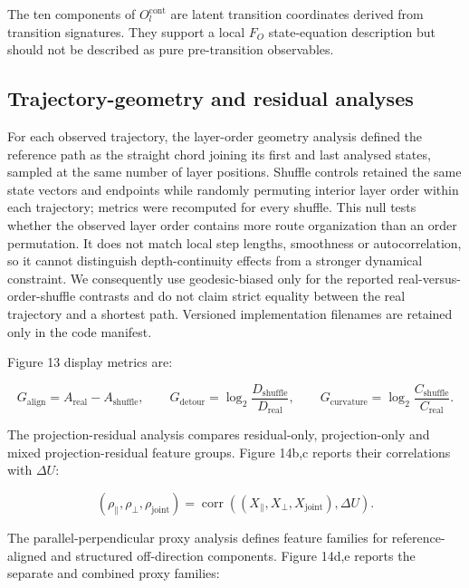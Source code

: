 \documentclass[11pt]{article}
\begin{document}
The ten components of \(O_l^{\mathrm{cont}}\) are latent transition coordinates derived from transition signatures. They support a local \(F_O\) state-equation description but should not be described as pure pre-transition observables.

\subsection*{Trajectory-geometry and residual analyses}
For each observed trajectory, the layer-order geometry analysis defined the reference path as the straight chord joining its first and last analysed states, sampled at the same number of layer positions. Shuffle controls retained the same state vectors and endpoints while randomly permuting interior layer order within each trajectory; metrics were recomputed for every shuffle. This null tests whether the observed layer order contains more route organization than an order permutation. It does not match local step lengths, smoothness or autocorrelation, so it cannot distinguish depth-continuity effects from a stronger dynamical constraint. We consequently use geodesic-biased only for the reported real-versus-order-shuffle contrasts and do not claim strict equality between the real trajectory and a shortest path. Versioned implementation filenames are retained only in the code manifest.

Figure 13 display metrics are:

\begin{equation*}
G_{\mathrm{align}}=A_{\mathrm{real}}-A_{\mathrm{shuffle}},\qquad
G_{\mathrm{detour}}=\log_2\!\frac{D_{\mathrm{shuffle}}}{D_{\mathrm{real}}},\qquad
G_{\mathrm{curvature}}=\log_2\!\frac{C_{\mathrm{shuffle}}}{C_{\mathrm{real}}}.
\end{equation*}

The projection-residual analysis compares residual-only, projection-only and mixed projection-residual feature groups. Figure 14b,c reports their correlations with \(\Delta U\):

\begin{equation*}
(\rho_{\parallel},\rho_{\perp},\rho_{\mathrm{joint}})
=\operatorname{corr}\!\left((X_{\parallel},X_{\perp},X_{\mathrm{joint}}),\Delta U\right).
\end{equation*}

The parallel-perpendicular proxy analysis defines feature families for reference-aligned and structured off-direction components. Figure 14d,e reports the separate and combined proxy families:
\end{document}
